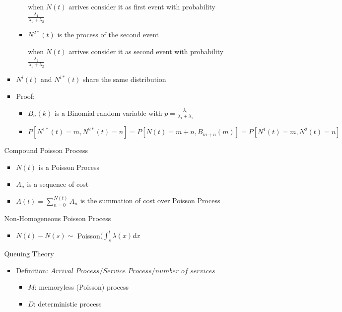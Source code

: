 \documentclass[a4paper]{article}
\begin{document}
\begin{itemize}
\begin{itemize}
\begin{itemize}
\begin{itemize}
                                when $N(t)$ arrives consider it as first event with probability $\frac{\lambda_1}{\lambda_1 + \lambda_2}$
                            \item $N^{2*}(t)$ is the process of the second event

                                when $N(t)$ arrives consider it as second event with probability $\frac{\lambda_2}{\lambda_1 + \lambda_2}$
                        \end{itemize}
                    \item $N^i(t)$ and $N^{i*}(t)$ share the same distribution
                    \item Proof:
                        \begin{itemize}
                            \item $B_n(k)$ is a Binomial random variable with $p = \frac{\lambda_1}{\lambda_1 + \lambda_2}$
                            \item $P[N^{1*}(t) = m, N^{2*}(t) = n] = P[N(t) = m + n, B_{m+n}(m)] = P[N^1(t) = m, N^2(t) = n]$
                        \end{itemize}
                \end{itemize}
                Compound Poisson Process
                \begin{itemize}
                    \item $N(t)$ is a Poisson Process
                    \item $A_n$ is a sequence of cost
                    \item $A(t) = \sum_{n=0}^{N(t)} A_n$ is the summation of cost over Poisson Process
                \end{itemize}
                Non-Homogeneous Poisson Process
                \begin{itemize}
                    \item $N(t) - N(s) \sim$ Poisson$(\int_s^t \lambda(x) dx$
                \end{itemize}
                Queuing Theory
                \begin{itemize}
                    \item Definition: $\mathit{Arrival\_Process}/ \mathit{Service\_Process}/ \mathit{number\_of\_services}$
                        \begin{itemize}
                            \item $M$: memoryless (Poisson) process
                            \item $D$: deterministic process

\end{itemize}
\end{itemize}
\end{itemize}
\end{itemize}
\end{document}
